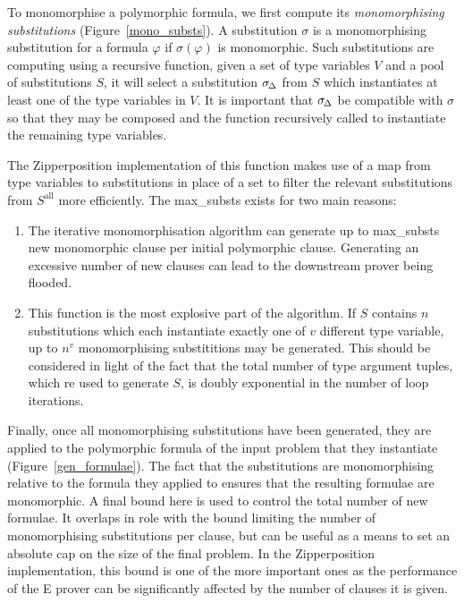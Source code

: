 \documentclass[]{ceurart}
\def\negvthinspace{\kern-0.083333em}
\begin{document}
To monomorphise a polymorphic formula, we first compute its \emph{monomorphising substitutions} (Figure~\ref{mono_substs}). A substitution \(\sigma\) is a monomorphising substitution for a formula \(\varphi\) if \(\sigma(\varphi)\) is monomorphic. Such substitutions are computing using a recursive function, given a set of type variables \(V\) and a pool of substitutions \(S\), it will select a substitution \(\sigma_{\negvthinspace\Delta}\) from \(S\) which instantiates at least one of the type variables in \(V\). It is important that \(\sigma_{\negvthinspace\Delta}\) be compatible with \(\sigma\) so that they may be composed and the function recursively called to instantiate the remaining type variables.

The Zipperposition implementation of this function makes use of a map from type variables to substitutions in place of a set to filter the relevant substitutions from \(S^\text{all}\) more efficiently. The \textcolor{ourblueviolet}{max\_substs} exists for two main reasons:
\begin{enumerate}
   \item The iterative monomorphisation algorithm can generate up to \textcolor{ourblueviolet}{max\_substs} new monomorphic clause per initial polymorphic clause. Generating an excessive number of new clauses can lead to the downstream prover being flooded.
   \item This function is the most explosive part of the algorithm. If \(S\) contains \(n\) substitutions which each instantiate exactly one of \(v\) different type variable, up to \(n^v\) monomorphising substititions may be generated. This should be considered in light of the fact that the total number of type argument tuples, which  re used to generate \(S\), is doubly exponential in the number of loop iterations.
\end{enumerate}

Finally, once all monomorphising substitutions have been generated, they are applied to the polymorphic formula of the input problem that they instantiate (Figure~\ref{gen_formulae}). The fact that the substitutions are monomorphising relative to the formula they applied to ensures that the resulting formulae are monomorphic. A final bound here is used to control the total number of new formulae. It overlaps in role with the bound limiting the number of monomorphising substitutions per clause, but can be useful as a means to set an absolute cap on the size of the final problem. In the Zipperposition implementation, this bound is one of the more important ones as the performance of the E prover can be significantly affected by the number of clauses it is given.
\end{document}
